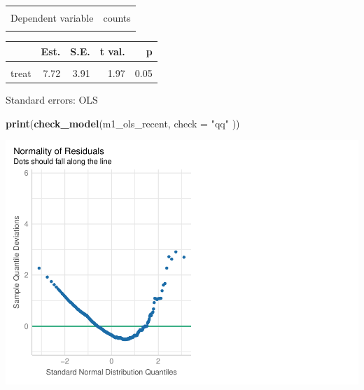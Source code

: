 \documentclass[
]{article}
\newenvironment{Shaded}{\begin{snugshade}}{\end{snugshade}}
\newcommand{\AttributeTok}[1]{\textcolor[rgb]{0.13,0.29,0.53}{#1}}
\newcommand{\FunctionTok}[1]{\textcolor[rgb]{0.13,0.29,0.53}{\textbf{#1}}}
\newcommand{\NormalTok}[1]{#1}
\newcommand{\StringTok}[1]{\textcolor[rgb]{0.31,0.60,0.02}{#1}}
\begin{document}
\begin{table}[!h]
\centering
\begin{tabular}{lr}
\toprule
\cellcolor{gray!10}{Observations} & \cellcolor{gray!10}{466}\\
Dependent variable & counts\\
\cellcolor{gray!10}{Type} & \cellcolor{gray!10}{OLS linear regression}\\
\bottomrule
\end{tabular}
\end{table}  \begin{table}[!h]
\centering
\begin{threeparttable}
\begin{tabular}{lrrrr}
\toprule
  & Est. & S.E. & t val. & p\\
\midrule
\cellcolor{gray!10}{(Intercept)} & \cellcolor{gray!10}{27.27} & \cellcolor{gray!10}{2.69} & \cellcolor{gray!10}{10.15} & \cellcolor{gray!10}{0.00}\\
treat & 7.72 & 3.91 & 1.97 & 0.05\\
\bottomrule
\end{tabular}
\begin{tablenotes}
\item Standard errors: OLS
\end{tablenotes}
\end{threeparttable}
\end{table}

\begin{Shaded}
\begin{Highlighting}[]
\FunctionTok{print}\NormalTok{(}\FunctionTok{check\_model}\NormalTok{(m1\_ols\_recent,  }\AttributeTok{check =} \StringTok{"qq"}\NormalTok{ ))}
\end{Highlighting}
\end{Shaded}

\includegraphics{hw1-lobstrs-eds241_files/figure-latex/unnamed-chunk-31-1.pdf}
\end{document}
